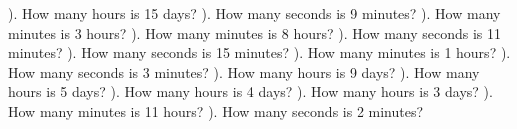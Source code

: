 \documentclass{article}%
\begin{document}
\newline%
). How many hours is 15 days?%
\newline%
\newline%
). How many seconds is 9 minutes?%
\newline%
\newline%
). How many minutes is 3 hours?%
\newline%
\newline%
). How many minutes is 8 hours?%
\newline%
\newline%
). How many seconds is 11 minutes?%
\newline%
\newline%
). How many seconds is 15 minutes?%
\newline%
\newline%
). How many minutes is 1 hours?%
\newline%
\newline%
). How many seconds is 3 minutes?%
\newline%
\newline%
). How many hours is 9 days?%
\newline%
\newline%
). How many hours is 5 days?%
\newline%
\newline%
). How many hours is 4 days?%
\newline%
\newline%
). How many hours is 3 days?%
\newline%
\newline%
). How many minutes is 11 hours?%
\newline%
\newline%
). How many seconds is 2 minutes?%
\newline%
\newline%
\end{document}
